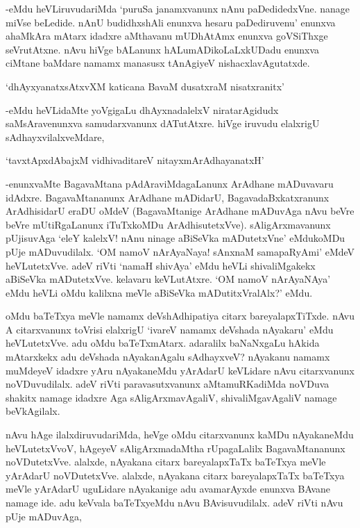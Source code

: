 -eMdu heVLiruvudariMda `puruSa janamxvanunx nAnu paDedidedxVne. nanage miVse beLedide. nAnU budidhxshAli enunxva hesaru paDediruvenu' enunxva ahaMkAra mAtarx idadxre aMthavanu mUDhAtAmx enunxva goVSiThxge seVrutAtxne. nAvu hiVge bALanunx hALumADikoLaLxkUDadu enunxva ciMtane baMdare namamx manasusx tAnAgiyeV nishacxlavAgutatxde.

\begin{shloka}
`dhAyxyanatxsAtxvXM katicana BavaM dusatxraM nisatxranitx'
\end{shloka}

-eMdu heVLidaMte yoVgigaLu dhAyxnadalelxV niratarAgidudx saMsAravenunxva samudarxvanunx dATutAtxre. hiVge iruvudu elalxrigU sAdhayxvilalxveMdare,

\begin{shloka}
`tavxtApxdAbajxM vidhivaditareV nitayxmArAdhayanatxH'
\end{shloka}

-enunxvaMte BagavaMtana pAdAraviMdagaLanunx ArAdhane mADuvavaru idAdxre. BagavaMtananunx ArAdhane mADidarU, BagavadaBxkatxranunx ArAdhisidarU eraDU oMdeV (BagavaMtanige ArAdhane mADuvAga nAvu beVre beVre mUtiRgaLanunx iTuTxkoMDu ArAdhisutetxVve). sAligArxmavanunx pUjisuvAga `eleY kalelxV! nAnu ninage aBiSeVka mADutetxVne' eMdukoMDu pUje mADuvudilalx. `OM namoV nArAyaNaya! sAnxnaM samapaRyAmi' eMdeV heVLutetxVve. adeV riVti `namaH shivAya' eMdu heVLi shivaliMgakekx aBiSeVka mADutetxVve. kelavaru keVLutAtxre. `OM namoV nArAyaNAya' eMdu heVLi oMdu kalilxna meVle aBiSeVka mADutitxVralAlx?' eMdu.

oMdu baTeTxya meVle namamx deVshAdhipatiya citarx bareyalapxTiTxde. nAvu A citarxvanunx toVrisi elalxrigU `ivareV namamx deVshada nAyakaru' eMdu heVLutetxVve. adu oMdu baTeTxmAtarx. adaralilx baNaNxgaLu hAkida mAtarxkekx adu deVshada nAyakanAgalu sAdhayxveV? nAyakanu namamx muMdeyeV idadxre yAru nAyakaneMdu yArAdarU keVLidare nAvu citarxvanunx noVDuvudilalx. adeV riVti paravasutxvanunx aMtamuRKadiMda noVDuva shakitx namage idadxre Aga sAligArxmavAgaliV, shivaliMgavAgaliV namage beVkAgilalx.

nAvu hAge ilalxdiruvudariMda, heVge oMdu citarxvanunx kaMDu nAyakaneMdu heVLutetxVvoV, hAgeyeV sAligArxmadaMtha rUpagaLalilx BagavaMtananunx noVDutetxVve. alalxde, nAyakana citarx bareyalapxTaTx baTeTxya meVle yArAdarU noVDutetxVve. alalxde, nAyakana citarx bareyalapxTaTx baTeTxya meVle yArAdarU uguLidare nAyakanige adu avamarAyxde enunxva BAvane namage ide. adu keVvala baTeTxyeMdu nAvu BAvisuvudilalx. adeV riVti nAvu pUje mADuvAga,

